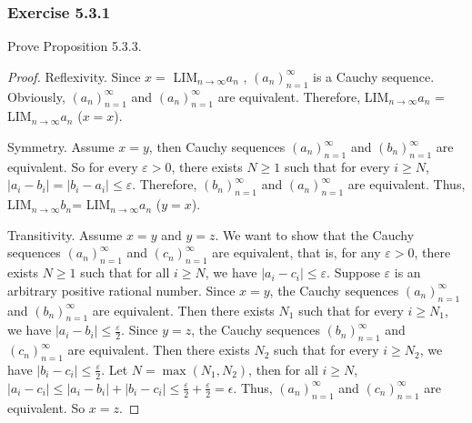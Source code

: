 \documentclass[12pt, letter]{article}
\newcommand{\an}{$(a_n)_{n=1}^\infty$ }
\newcommand{\bn}{$(b_n)_{n=1}^\infty$ }
\newcommand{\cn}{$(c_n)_{n=1}^\infty$ }
\newcommand{\la}{LIM$_{n\to\infty}a_n$  }
\newcommand{\lb}{LIM$_{n\to\infty}b_n$}
\begin{document}
\subsubsection*{Exercise 5.3.1}
Prove Proposition 5.3.3.
\begin{proof}
    Reflexivity. Since $x=$ \la, \an is a Cauchy sequence. Obviously, \an and \an are equivalent. Therefore, \la = \la ($x=x$).

    Symmetry. Assume $x=y$, then Cauchy sequences \an and \bn are equivalent. So for every $\varepsilon>0$, there exists $N\geq 1$ such that for every $i\geq N$, 
    $|a_i-b_i|=|b_i-a_i|\leq\varepsilon$. Therefore, \bn and \an are equivalent. Thus, \lb = \la ($y=x$).

    Transitivity. Assume $x=y$ and $y=z$. We want to show that the Cauchy sequences \an and \cn are equivalent, that is, 
    for any $\varepsilon>0$, there exists $N\geq 1$ such that for all $i\geq N$, we have $|a_i-c_i|\leq \varepsilon$. Suppose $\varepsilon$ is an arbitrary positive rational number.
     Since $x=y$, the Cauchy sequences \an and \bn are equivalent. Then there exists $N_1$ such that for every $i\geq N_1$, we have $|a_i-b_i|\leq \frac{\varepsilon}{2}$.
     Since $y=z$, the Cauchy sequences \bn and \cn are equivalent. Then there exists $N_2$ such that for every $i\geq N_2$, we have $|b_i-c_i|\leq \frac{\varepsilon}{2}$.
     Let $N=\max(N_1,N_2)$, then for all $i\geq N$, $|a_i-c_i|\leq |a_i-b_i|+|b_i-c_i|\leq \frac{\varepsilon}{2}+\frac{\varepsilon}{2}=\epsilon$. Thus, \an and \cn are equivalent. 
     So $x=z$.
\end{proof} 
\end{document}

